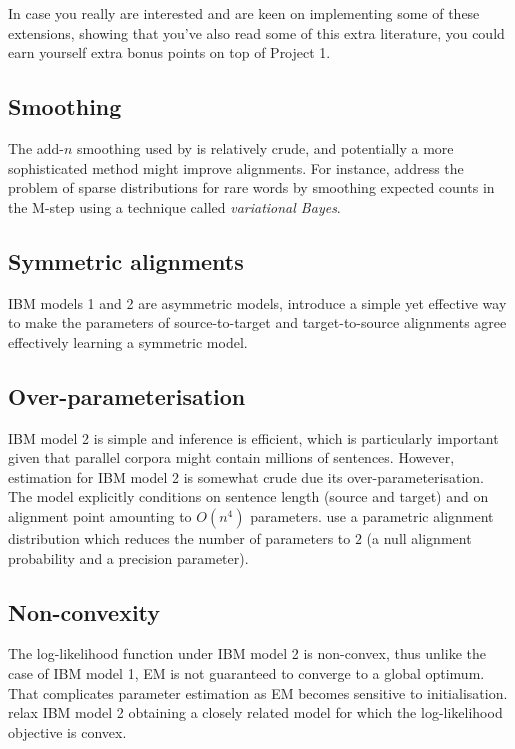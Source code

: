In case you really are interested and are keen on implementing some of these
extensions, showing that you've also read some of this extra literature, 
you could earn yourself extra bonus points on top of Project 1.
%
%
\subsection*{Smoothing}

The add-$n$ smoothing used by \cite{Moore:2004:IBM1} is relatively
crude, and potentially a more sophisticated method might improve
alignments.  For instance, \citet{Riley+2012:VBWA} address the problem
of sparse distributions for rare words by smoothing expected counts in
the M-step using a technique called \emph{variational Bayes}.


\subsection*{Symmetric alignments}

IBM models 1 and 2 are asymmetric models, \citep{Liang+2006:ABA} introduce a simple yet effective way to make the parameters of source-to-target and target-to-source alignments agree effectively learning a symmetric model.

\subsection*{Over-parameterisation}
IBM model 2 is simple and inference is efficient, which is particularly important given that parallel corpora might contain millions of sentences. 
However, estimation for IBM model 2 is somewhat crude due its over-parameterisation. 
The model explicitly conditions on sentence length (source and target) and on alignment point amounting to $O(n^4)$ parameters.
\cite{Dyer+2013:IBM2} use a parametric alignment distribution which reduces the number of parameters to $2$ (a null alignment probability and a precision parameter).

\subsection*{Non-convexity}

The log-likelihood function under IBM model 2 is non-convex, thus unlike the case of IBM model 1, EM is not guaranteed to converge to a global optimum.
That complicates parameter estimation as EM becomes sensitive to initialisation.
\cite{Simion+2013:IBM2} relax IBM model 2 obtaining a closely related model for which the log-likelihood objective is convex. %

